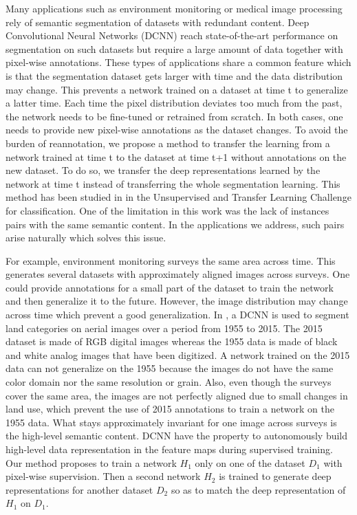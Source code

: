 \documentclass{bmvc2k}
\begin{document}
Many applications such as environment monitoring or medical image processing 
rely of semantic segmentation of datasets with redundant content. 
Deep Convolutional Neural Networks (DCNN) reach state-of-the-art performance
on segmentation on such datasets but require a large amount of data 
together with pixel-wise annotations. 
These types of applications share a common feature which is that the segmentation dataset gets larger with time and the data distribution may change. This prevents a network 
trained on a dataset at time t to generalize a latter time. 
Each time the pixel distribution deviates too much from the past, 
the network needs to be fine-tuned or retrained from scratch. In
both cases, one needs to provide new pixel-wise annotations as the dataset changes. 
To avoid the burden of reannotation, we propose a method to transfer the learning from a network trained at
time t to the dataset at time t+1 without annotations on the new dataset. To do
so, we transfer the deep representations learned by the network at time t 
instead of transferring the whole segmentation learning. 
This method has been studied in \cite{bengio2012deep} in the Unsupervised and 
Transfer Learning Challenge for classification. 
One of the limitation in this work was the lack of
instances pairs with the same semantic content. In the applications we address, 
such pairs arise naturally which solves this issue. 

For example,
environment monitoring surveys the same area across time. This generates several
datasets with approximately aligned images across surveys. 
One could provide annotations for a
small part of the dataset to train the network and then generalize it to the future.
However,
the image distribution may change across time which prevent a good generalization.
In \cite{richard2018}, a DCNN is used to segment land categories on aerial images over a 
period from 1955 to 2015. The 2015 dataset is made of RGB digital images whereas 
the 1955 data is made of black and white analog images that have been digitized.
A network trained on the 2015 data can not generalize on the 1955 because
the images do not have the same color domain nor the same resolution or grain. 
Also, even though 
the surveys cover the same area, the images are not perfectly aligned due to small changes in land use, which prevent
the use of 2015 annotations to train a network on the 1955 data. 
What stays approximately invariant for one image across surveys is the 
high-level semantic content. DCNN have the property to autonomously build 
high-level data representation in the feature maps during supervised training. 
Our method proposes to train a network $H_1$ only on one of the dataset 
$D_1$ with 
pixel-wise supervision. Then a second network $H_2$ is trained 
to generate deep representations for another dataset $D_2$
so as to match the deep representation of $H_1$ on $D_1$. 
\end{document}
